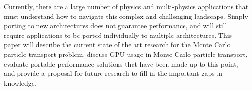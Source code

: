 %
Currently, there are a large number of physics and multi-physics applications that must understand how to navigate this complex and challenging landscape.
%
Simply porting to new architectures does not guarantee performance, and will still require applications to be ported individually to multiple architectures.
%
This paper will describe the current state of the art research for the Monte Carlo particle transport problem, discuss GPU usage in Monte Carlo particle transport, evaluate portable performance solutions that have been made up to this point, and provide a proposal for future research to fill in the important gaps in knowledge.
%

